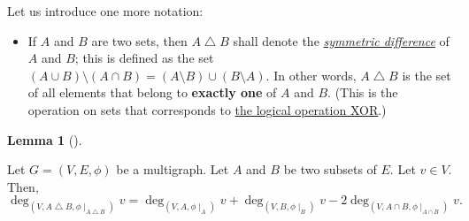 \documentclass[numbers=enddot,12pt,final,onecolumn,notitlepage]{scrartcl}%
\theoremstyle{definition}
\newtheorem{lem}[theo]{Lemma}
\newenvironment{lemma}[1][]
{\begin{lem}[#1]\begin{leftbar}}
{\end{leftbar}\end{lem}}
\newcommand{\tup}[1]{\left( #1 \right)}
\begin{document}
Let us introduce one more notation:

\begin{itemize}
\item If $A$ and $B$ are two sets, then $A \bigtriangleup B$ shall
denote the
\href{https://en.wikipedia.org/wiki/Symmetric_difference}{\textit{symmetric difference}}
of $A$ and $B$; this is defined as the
set $\tup{A \cup B} \setminus \tup{A \cap B}
= \tup{A \setminus B} \cup \tup{B \setminus A}$. In other words,
$A \bigtriangleup B$ is the set of all elements that belong to
\textbf{exactly one} of $A$ and $B$. (This is the operation on sets
that corresponds to
\href{https://en.wikipedia.org/wiki/Exclusive_or}{the logical operation XOR}.)
\end{itemize}

\begin{lemma} \label{lem.mt1.cyctree.AsymB}
Let $G = \tup{V, E, \phi}$ be a multigraph. Let $A$ and $B$ be two
subsets of $E$. Let $v \in V$. Then,
\[
\deg_{\tup{V, A \bigtriangleup B, \phi\mid_{A \bigtriangleup B}}} v
= \deg_{\tup{V, A, \phi\mid_A}} v
  + \deg_{\tup{V, B, \phi\mid_B}} v
  - 2 \deg_{\tup{V, A \cap B, \phi\mid_{A \cap B}}} v.
\]
\end{lemma}
\end{document}
